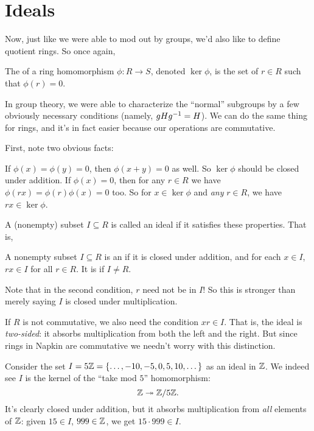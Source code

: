 \section{Ideals}
Now, just like we were able to mod out by groups,
we'd also like to define quotient rings.
So once again,
\begin{definition}
	The  of a ring homomorphism $\phi \colon R \to S$,
	denoted $\ker \phi$, is the set of $r \in R$ such that $\phi(r) = 0$.
\end{definition}

In group theory, we were able to characterize the ``normal'' subgroups by a few
obviously necessary conditions (namely, $gHg^{-1} = H$).
We can do the same thing for rings, and it's in fact easier because our operations are commutative.

First, note two obvious facts:
\begin{itemize}
	\ii If $\phi(x) = \phi(y) = 0$, then $\phi(x+y) = 0$ as well.
	So $\ker \phi$ should be closed under addition.
	\ii If $\phi(x) = 0$, then for any $r \in R$ we have
	$\phi(rx) = \phi(r)\phi(x) = 0$ too.
	So for $x \in \ker \phi$ and \emph{any} $r \in R$,
	we have $rx \in \ker\phi$.
\end{itemize}

A (nonempty) subset $I \subseteq R$ is called
an ideal if it satisfies these properties.
That is,
\begin{definition}
	A nonempty subset $I \subseteq R$ is an 
	if it is closed under addition, and for each $x \in I$,
	$rx \in I$ for all $r \in R$.
	It is  if $I \neq R$.
\end{definition}

Note that in the second condition, $r$ need not be in $I$!
So this is stronger than merely saying $I$ is closed under multiplication.
\begin{remark}
	If $R$ is not commutative, we also need the condition $xr \in I$.
	That is, the ideal is \emph{two-sided}: it absorbs multiplication
	from both the left and the right.
	But since rings in Napkin are commutative
	we needn't worry with this distinction.
\end{remark}

\begin{example}
	Consider the set $I = 5\mathbb Z = \{\dots,-10,-5,0,5,10,\dots\}$ as an ideal in $\mathbb Z$.
	We indeed see $I$ is the kernel of the ``take mod $5$'' homomorphism:
	\[ \mathbb Z \twoheadrightarrow \mathbb Z/5\mathbb Z. \]
	It's clearly closed under addition,
	but it absorbs multiplication from \emph{all} elements of $\mathbb Z$:
	given $15 \in I$, $999 \in \mathbb Z$, we get $15 \cdot 999 \in I$.
\end{example}

